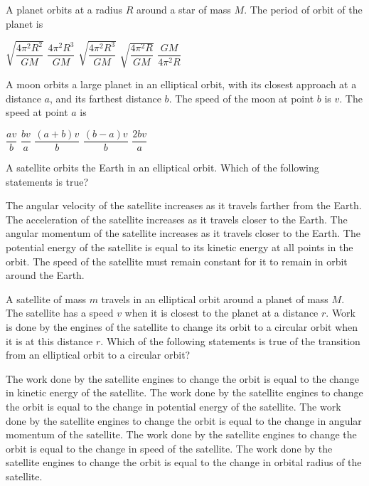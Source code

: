 \documentclass{../../../oss-apphys-exam}
\begin{document}
\begin{questions}
  \question A planet orbits at a radius $R$ around a star of mass $M$. The
  period of orbit of the planet is
  \begin{choices}
    \choice $\sqrt{\dfrac{4\pi^2R^2}{GM}}$
    \choice $\dfrac{4\pi^2R^3}{GM}$
    \choice $\sqrt{\dfrac{4\pi^2R^3}{GM}}$
    \choice $\sqrt{\dfrac{4\pi^2R}{GM}}$
    \choice $\dfrac{GM}{4\pi^2R}$
  \end{choices}
    
  \question A moon orbits a large planet in an elliptical orbit, with its
  closest approach at a distance $a$, and its farthest distance $b$. The
  speed of the moon at point $b$ is $v$. The speed at point $a$ is
  \begin{choices}
    \choice $\dfrac{av}b$
    \choice $\dfrac{bv}a$
    \choice $\dfrac{(a+b)v}b$
    \choice $\dfrac{(b-a)v}b$
    \choice $\dfrac{2bv}a$
  \end{choices}

  \question A satellite orbits the Earth in an elliptical orbit. Which of the
  following statements is true?
  \begin{choices}
    \choice The angular velocity of the satellite increases as it travels
    farther from the Earth.
    \choice The acceleration of the satellite increases as it travels closer
    to the Earth.
    \choice The angular momentum of the satellite increases as it travels
    closer to the Earth.
    \choice The potential energy of the satellite is equal to its kinetic
    energy at all points in the orbit.
    \choice The speed of the satellite must remain constant for it to remain
    in orbit around the Earth.
  \end{choices}
  \newpage
  
  \question A satellite of mass $m$ travels in an elliptical orbit around a
  planet of mass $M$. The satellite has a speed $v$ when it is closest to
  the planet at a distance $r$. Work is done by the engines of the satellite
  to change its orbit to a circular orbit when it is at this distance $r$.
  Which of the following statements is true of the transition from an
  elliptical orbit to a circular orbit?
  \begin{choices}
    \choice The work done by the satellite engines to change the orbit is
    equal to the change in kinetic energy of the satellite.
    \choice The work done by the satellite engines to change the orbit is
    equal to the change in potential energy of the satellite.
    \choice The work done by the satellite engines to change the orbit is
    equal to the change in angular momentum of the satellite.
    \choice The work done by the satellite engines to change the orbit is
    equal to the change in speed of the satellite.
    \choice The work done by the satellite engines to change the orbit is
    equal to the change in orbital radius of the satellite.
  \end{choices}
    

\end{questions}
\end{document}

